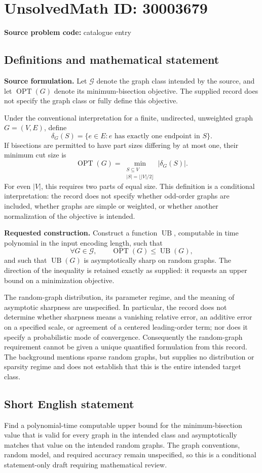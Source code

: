 \documentclass[11pt]{article}
\begin{document}
\section*{UnsolvedMath ID: 30003679}
\textbf{Source problem code:} catalogue entry
\subsection{Definitions and mathematical statement}
\textbf{Source formulation.} Let \(\mathcal G\) denote the graph class intended by the source, and let \(\operatorname{OPT}(G)\) denote its minimum-bisection objective. The supplied record does not specify the graph class or fully define this objective.

Under the conventional interpretation for a finite, undirected, unweighted graph \(G=(V,E)\), define
\[
\delta_G(S)=\{e\in E: e\text{ has exactly one endpoint in }S\}.
\]
If bisections are permitted to have part sizes differing by at most one, their minimum cut size is
\[
\operatorname{OPT}(G)=\min_{\substack{S\subseteq V\\ |S|=\lfloor |V|/2\rfloor}}|\delta_G(S)|.
\]
For even \(|V|\), this requires two parts of equal size. This definition is a conditional interpretation: the record does not specify whether odd-order graphs are included, whether graphs are simple or weighted, or whether another normalization of the objective is intended.

\textbf{Requested construction.} Construct a function \(\operatorname{UB}\), computable in time polynomial in the input encoding length, such that
\[
\forall G\in\mathcal G,\qquad \operatorname{OPT}(G)\leq \operatorname{UB}(G),
\]
and such that \(\operatorname{UB}(G)\) is asymptotically sharp on random graphs. The direction of the inequality is retained exactly as supplied: it requests an upper bound on a minimization objective.

The random-graph distribution, its parameter regime, and the meaning of asymptotic sharpness are unspecified. In particular, the record does not determine whether sharpness means a vanishing relative error, an additive error on a specified scale, or agreement of a centered leading-order term; nor does it specify a probabilistic mode of convergence. Consequently the random-graph requirement cannot be given a unique quantified formulation from this record. The background mentions sparse random graphs, but supplies no distribution or sparsity regime and does not establish that this is the entire intended target class.
\subsection{Short English statement}
Find a polynomial-time computable upper bound for the minimum-bisection value that is valid for every graph in the intended class and asymptotically matches that value on the intended random graphs. The graph conventions, random model, and required accuracy remain unspecified, so this is a conditional statement-only draft requiring mathematical review.
\end{document}
